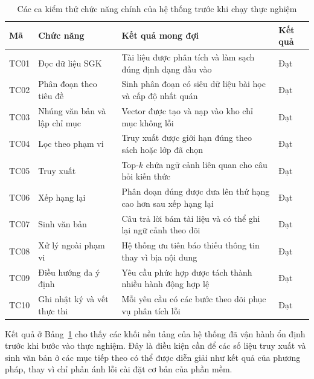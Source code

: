 \documentclass[../DoAn.tex]{subfiles}
\begin{document}
\begin{table}[H]
    \centering
    \small
    \renewcommand{\arraystretch}{1.12}
    \begin{tabular}{|p{}|p{}|p{}|p{}|}
        \hline
        \textbf{Mã} & \textbf{Chức năng} & \textbf{Kết quả mong đợi} & \textbf{Kết quả} \\
        \hline
        TC01 & Đọc dữ liệu SGK & Tài liệu được phân tích và làm sạch đúng định dạng đầu vào & Đạt \\
        \hline
        TC02 & Phân đoạn theo tiêu đề & Sinh phân đoạn có siêu dữ liệu bài học và cấp độ nhất quán & Đạt \\
        \hline
        TC03 & Nhúng văn bản và lập chỉ mục & Vector được tạo và nạp vào kho chỉ mục không lỗi & Đạt \\
        \hline
        TC04 & Lọc theo phạm vi & Truy xuất được giới hạn đúng theo sách hoặc lớp đã chọn & Đạt \\
        \hline
        TC05 & Truy xuất & Top-$k$ chứa ngữ cảnh liên quan cho câu hỏi kiến thức & Đạt \\
        \hline
        TC06 & Xếp hạng lại & Phân đoạn đúng được đưa lên thứ hạng cao hơn sau xếp hạng lại & Đạt \\
        \hline
        TC07 & Sinh văn bản & Câu trả lời bám tài liệu và có thể ghi lại ngữ cảnh theo dõi & Đạt \\
        \hline
        TC08 & Xử lý ngoài phạm vi & Hệ thống ưu tiên báo thiếu thông tin thay vì bịa nội dung & Đạt \\
        \hline
        TC09 & Điều hướng đa ý định & Yêu cầu phức hợp được tách thành nhiều hành động hợp lệ & Đạt \\
        \hline
        TC10 & Ghi nhật ký và vết thực thi & Mỗi yêu cầu có các bước theo dõi phục vụ phân tích lỗi & Đạt \\
        \hline
    \end{tabular}
    \caption{Các ca kiểm thử chức năng chính của hệ thống trước khi chạy thực nghiệm}
    \label{tab:functional-tests}
\end{table}

Kết quả ở Bảng~\ref{tab:functional-tests} cho thấy các khối nền tảng của hệ thống đã vận hành ổn định trước khi bước vào thực nghiệm. Đây là điều kiện cần để các số liệu truy xuất và sinh văn bản ở các mục tiếp theo có thể được diễn giải như kết quả của phương pháp, thay vì chỉ phản ánh lỗi cài đặt cơ bản của phần mềm.
\end{document}
